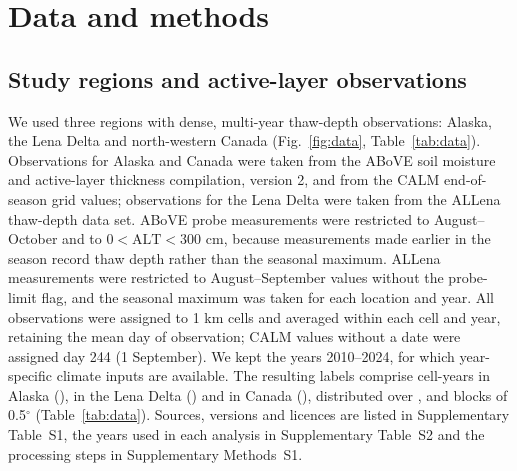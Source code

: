 \section{Data and methods}\label{sec:methods}

\subsection{Study regions and active-layer observations}
We used three regions with dense, multi-year thaw-depth observations: Alaska, the Lena Delta and north-western Canada (Fig.~\ref{fig:data}, Table~\ref{tab:data}). Observations for Alaska and Canada were taken from the ABoVE soil moisture and active-layer thickness compilation, version 2\cite{Moore2025}, and from the CALM end-of-season grid values\cite{Streletskiy2025}; observations for the Lena Delta were taken from the ALLena thaw-depth data set\cite{Veremeeva2025}. ABoVE probe measurements were restricted to August--October and to $0<\mathrm{ALT}<300$ cm, because measurements made earlier in the season record thaw depth rather than the seasonal maximum. ALLena measurements were restricted to August--September values without the probe-limit flag, and the seasonal maximum was taken for each location and year. All observations were assigned to 1 km cells and averaged within each cell and year, retaining the mean day of observation; CALM values without a date were assigned day 244 (1 September). We kept the years 2010--2024, for which year-specific climate inputs are available. The resulting labels comprise \nncyAk{} cell-years in Alaska (\nyrsAk), \nncyLe{} in the Lena Delta (\nyrsLe) and \nncyCa{} in Canada (\nyrsCa), distributed over \nnblkAk, \nnblkLe{} and \nnblkCa{} blocks of 0.5$^\circ$ (Table~\ref{tab:data}). Sources, versions and licences are listed in Supplementary Table~S1, the years used in each analysis in Supplementary Table~S2 and the processing steps in Supplementary Methods~S1.




